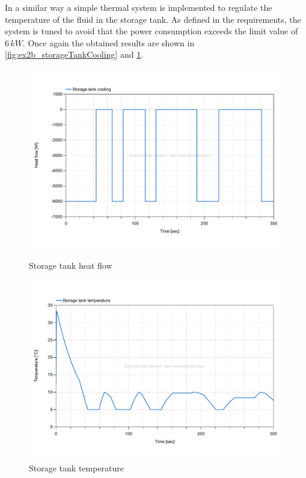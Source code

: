 \documentclass[11pt,a4paper,oneside]{article}
\begin{document}
In a similar way a simple thermal system is implemented to regulate the temperature of the fluid in the storage tank.
As defined in the requirements, the system is tuned to avoid that the power consumption exceeds the limit value of $6\,kW$.
Once again the obtained results are shown in \cref{fig:ex2b_storageTankCooling} and \cref{fig:ex2b_storageTankTemp}.
\begin{figure}[H]
    \centering
    \begin{minipage}{0.45\textwidth}
        \centering
        \includegraphics*[width=\textwidth, keepaspectratio]{Figures/ex2b_storageTankCooling.pdf}
        \caption[]{\label{fig:ex2b_storageTankCooling} Storage tank heat flow}
    \end{minipage}
    \hspace{0.05\textwidth}
    \begin{minipage}{0.45\textwidth}
        \centering
        \includegraphics*[width=\textwidth, keepaspectratio]{Figures/ex2b_storageTankTemp.pdf}
        \caption[]{\label{fig:ex2b_storageTankTemp} Storage tank temperature}
    \end{minipage}
\end{figure}
\end{document}
